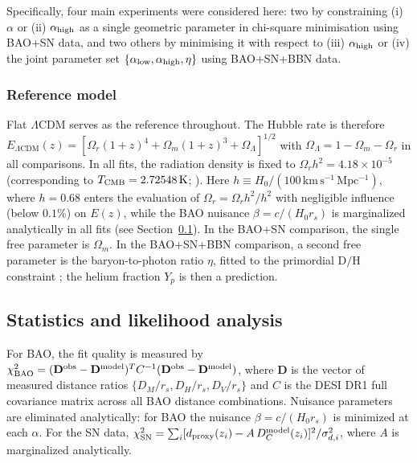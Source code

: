 ﻿\documentclass[3p,twocolumn]{elsarticle}
\begin{document}
Specifically, four main experiments were considered here: two by constraining (i) $\alpha$ or (ii) $\alpha_{\rm high}$ as a single geometric parameter in chi-square minimisation using BAO+SN data, and two others by minimising it with respect to (iii) $\alpha_{\rm high}$ or (iv) the joint parameter set $\{\alpha_{\rm low}, \alpha_{\rm high}, \eta\}$ using BAO+SN+BBN data.

\subsubsection{Reference model}\label{sec:lcdm}

Flat $\Lambda$CDM serves as the reference throughout.  The Hubble rate is therefore $E_{\Lambda\mathrm{CDM}}(z)=[\Omega_r(1+z)^4+\Omega_m(1+z)^3+\Omega_\Lambda]^{1/2}$ with $\Omega_\Lambda=1-\Omega_m-\Omega_r$ in all comparisons.  In all fits, the radiation density is fixed to $\Omega_r h^2=4.18\times10^{-5}$ (corresponding to $T_{\rm CMB}=2.72548\,\mathrm{K}$; \cite{fixsen2009,fields2020bbn}). Here $h\equiv H_0/(100\,\mathrm{km\,s^{-1}\,Mpc^{-1}})$, where $h=0.68$ \cite{Monjo_2024} enters the evaluation of $\Omega_r=\Omega_r h^2/h^2$ with negligible influence (below $0.1\%$) on $E(z)$, while the BAO nuisance $\beta=c/(H_0 r_s)$ is marginalized analytically in all fits (see Section~\ref{sec:methods:likelihood}). In the BAO+SN comparison, the single free parameter is $\Omega_m$. In the BAO+SN+BBN comparison, a second free parameter is the baryon-to-photon ratio $\eta$, fitted to the primordial $\mathrm{D/H}$ constraint \cite{schoneberg2024bbn}; the helium fraction $Y_p$ is then a prediction. 

\subsection{Statistics and likelihood analysis}\label{sec:methods:likelihood}

For BAO, the fit quality is measured by $\chi_{\rm BAO}^2=(\mathbf{D}^{\rm obs}-\mathbf{D}^{\rm model})^T C^{-1}(\mathbf{D}^{\rm obs}-\mathbf{D}^{\rm model})$, where $\mathbf{D}$ is the vector of measured distance ratios $\{D_M/r_s, D_H/r_s, D_V/r_s\}$ and $C$ is the DESI DR1 full covariance matrix across all BAO distance combinations. Nuisance parameters are eliminated analytically: for BAO the nuisance $\beta=c/(H_0 r_s)$ is minimized at each $\alpha$. For the SN data, $\chi^2_{\rm SN}=\sum_i [d_{\rm proxy}(z_i)-A\,D_C^{\rm model}(z_i)]^2/\sigma_{d,i}^2$, where $A$ is marginalized analytically. 
\end{document}
